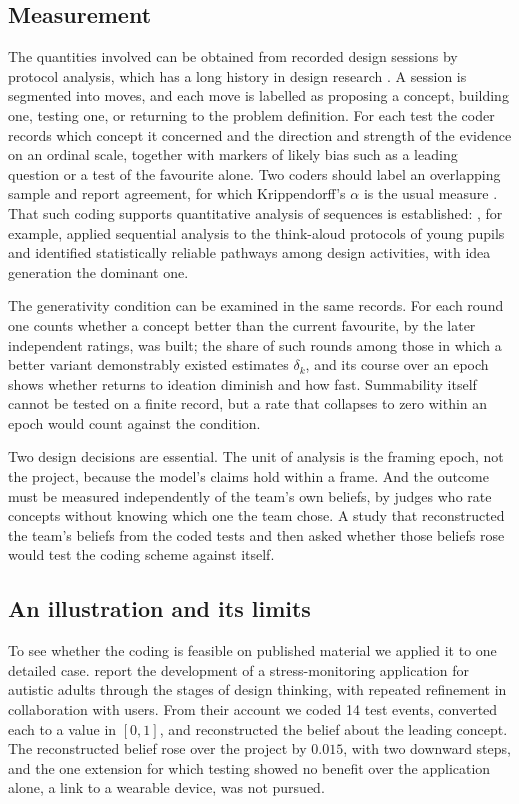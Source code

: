 \documentclass[10pt,twocolumn]{article}
\theoremstyle{definition}
\begin{document}
\subsection{Measurement}

The quantities involved can be obtained from recorded design sessions by protocol analysis, which has a long history in design research \citep{cross1996}. A session is segmented into moves, and each move is labelled as proposing a concept, building one, testing one, or returning to the problem definition. For each test the coder records which concept it concerned and the direction and strength of the evidence on an ordinal scale, together with markers of likely bias such as a leading question or a test of the favourite alone. Two coders should label an overlapping sample and report agreement, for which Krippendorff's $\alpha$ is the usual measure \citep{krippendorff2018}. That such coding supports quantitative analysis of sequences is established: \citet{sung2019}, for example, applied sequential analysis to the think-aloud protocols of young pupils and identified statistically reliable pathways among design activities, with idea generation the dominant one.

The generativity condition can be examined in the same records. For each round one counts whether a concept better than the current favourite, by the later independent ratings, was built; the share of such rounds among those in which a better variant demonstrably existed estimates $\delta_k$, and its course over an epoch shows whether returns to ideation diminish and how fast. Summability itself cannot be tested on a finite record, but a rate that collapses to zero within an epoch would count against the condition.

Two design decisions are essential. The unit of analysis is the framing epoch, not the project, because the model's claims hold within a frame. And the outcome must be measured independently of the team's own beliefs, by judges who rate concepts without knowing which one the team chose. A study that reconstructed the team's beliefs from the coded tests and then asked whether those beliefs rose would test the coding scheme against itself.

\subsection{An illustration and its limits}

To see whether the coding is feasible on published material we applied it to one detailed case. \citet{vanasselt2025} report the development of a stress-monitoring application for autistic adults through the stages of design thinking, with repeated refinement in collaboration with users. From their account we coded 14 test events, converted each to a value in $[0,1]$, and reconstructed the belief about the leading concept. The reconstructed belief rose over the project by $0.015$, with two downward steps, and the one extension for which testing showed no benefit over the application alone, a link to a wearable device, was not pursued.
\end{document}
